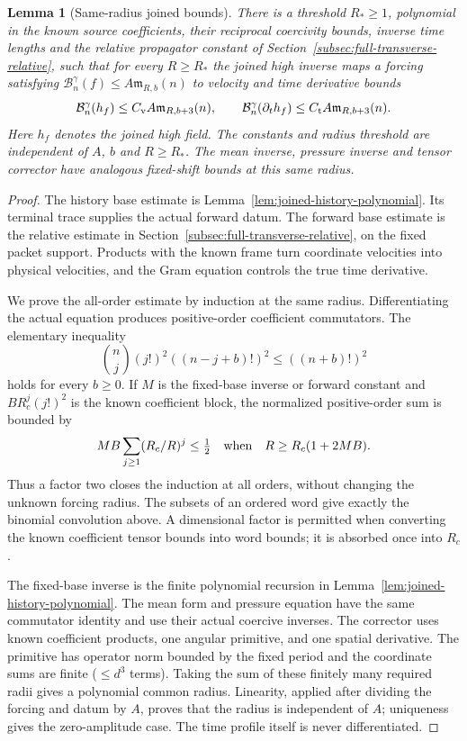 \documentclass[11pt]{article}
\newtheorem{lemma}[theorem]{Lemma}
\theoremstyle{definition}
\begin{document}
\begin{lemma}[Same-radius joined bounds]\label{lem:joined-same-radius}
There is a threshold $R_*\geq1$, polynomial in the known source coefficients,
their reciprocal coercivity bounds, inverse time lengths and the relative
propagator constant of Section~\ref{subsec:full-transverse-relative}, such that
for every $R\geq R_*$ the joined high inverse maps a forcing satisfying
$\mathcal B_n^\gamma(f)\leq A\mathfrak m_{R,b}(n)$ to velocity and
time derivative bounds
\[
 \mathcal B_n^\gamma(h_f)\leq C_{\rm v}A\mathfrak m_{R,b+3}(n),\qquad
 \mathcal B_n^\gamma(\partial_t h_f)\leq C_{\rm t}A\mathfrak m_{R,b+3}(n).
\]
Here $h_f$ denotes the joined high field. The constants and radius
threshold are independent of $A$, $b$ and $R\geq R_*$. The
mean inverse, pressure inverse and tensor corrector have analogous
fixed-shift bounds at this same radius.
\end{lemma}
\begin{proof}
The history base estimate is Lemma~\ref{lem:joined-history-polynomial}.
Its terminal trace supplies the actual forward datum. The forward
base estimate is the relative estimate in Section~\ref{subsec:full-transverse-relative}, on the
fixed packet support. Products with the known frame turn coordinate
velocities into physical velocities, and the Gram equation controls
the true time derivative.

We prove the all-order estimate by induction at the same radius. Differentiating
the actual equation produces positive-order coefficient commutators.
The elementary inequality
\[
 \binom nj(j!)^2((n-j+b)!)^2\leq((n+b)!)^2
\]
holds for every $b\geq0$. If $M$ is the fixed-base inverse or forward
constant and $B R_c^j(j!)^2$ is the known coefficient block, the normalized
positive-order sum is bounded by
\[
 MB\sum_{j\geq1}(R_c/R)^j\leq\tfrac12
 \quad\hbox{when}\quad R\geq R_c(1+2MB).
\]
Thus a factor two closes the induction at all orders, without changing
the unknown forcing radius. The subsets of an ordered word give exactly
the binomial convolution above. A dimensional factor is permitted when
converting the known coefficient tensor bounds into word bounds;
it is absorbed once into $R_c$.

The fixed-base inverse is the finite polynomial recursion in
Lemma~\ref{lem:joined-history-polynomial}. The mean form and pressure
equation have the same commutator identity and use their actual coercive
inverses. The corrector uses known coefficient products, one angular
primitive, and one spatial derivative. The primitive has operator norm bounded by
the fixed period and the coordinate sums are finite ($\leq d^3$
terms). Taking the sum of these finitely many required radii gives
a polynomial common radius. Linearity, applied after dividing the
forcing and datum by $A$, proves that the radius is independent of
$A$; uniqueness gives the zero-amplitude case. The time profile itself
is never differentiated.
\end{proof}
\end{document}
